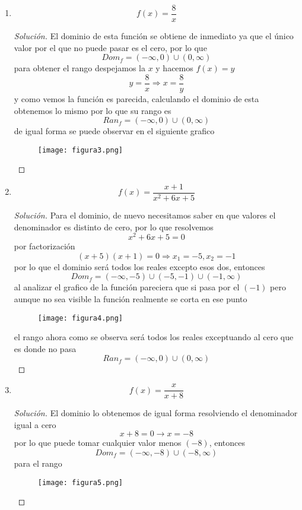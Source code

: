\documentclass[12pt]{article}
\newenvironment{solution}{\begin{proof}[Solución]}{\end{proof}}
\begin{document}
\begin{enumerate}
\begin{solution}
    \end{solution}
    \item \[f(x) = \frac{8}{x}\]\begin{solution}
        El dominio de esta función se obtiene de inmediato ya que el único valor por el que no puede pasar es el cero, por lo que
        \[Dom_f = (-\infty,0) \cup (0, \infty)\]
        para obtener el rango despejamos la $x$ y hacemos $f(x) = y$
        \[y = \frac{8}{x} \Rightarrow x = \frac{8}{y}\]
        y como vemos la función es parecida, calculando el dominio de esta obtenemos lo mismo por lo que su rango es
        \[Ran_f = (-\infty,0) \cup (0, \infty)\]
        de igual forma se puede observar en el siguiente grafico
        \begin{figure}[H]
            \centering
            \texttt{[image: figura3.png]}
        \end{figure}
    \end{solution}
    \item \[f(x) = \frac{x+1}{x^2+6x+5}\]\begin{solution}
        Para el dominio, de nuevo necesitamos saber en que valores el denominador es distinto de cero, por lo que resolvemos
        \[x^2+6x +5 = 0\] por factorización \[(x+5)(x+1) = 0 \Rightarrow x_1 = -5, x_2 = -1\]
        por lo que el dominio será todos los reales excepto esos dos, entonces
        \[Dom_f = (-\infty, -5) \cup (-5,-1) \cup (-1, \infty)\]
        al analizar el grafico de la función pareciera que si pasa por el $(-1)$ pero aunque no sea visible la función realmente se corta en ese punto
        \begin{figure}[H]
            \centering
            \texttt{[image: figura4.png]}
        \end{figure}
        el rango ahora como se observa será todos los reales exceptuando al cero que es donde no pasa
        \[Ran_f = (-\infty, 0) \cup (0, \infty)\]
    \end{solution}
    \item \[f(x) = \frac{x}{x+8}\] \begin{solution}
        El dominio lo obtenemos de igual forma resolviendo el denominador igual a cero
        \[x+8 = 0 \rightarrow x = -8\]
        por lo que puede tomar cualquier valor menos $(-8)$, entonces
        \[Dom_f = (-\infty,-8)\cup (-8,\infty)\]
        para el rango 
        \begin{figure}[H]
            \centering
            \texttt{[image: figura5.png]}
        \end{figure}
    \end{solution}
\end{enumerate}

\end{document}
